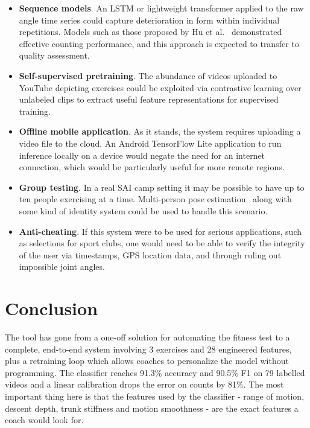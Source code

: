 \documentclass[conference]{IEEEtran}
\begin{document}
\begin{itemize}
     \item \textbf{Sequence models}. An LSTM or lightweight transformer applied to the raw angle time series could capture deterioration in form within individual repetitions. Models such as those proposed by Hu et al.~\cite{hu2022} demonstrated effective counting performance, and this approach is expected to transfer to quality assessment.
 \item \textbf{Self-supervised pretraining}. The abundance of videos uploaded to YouTube depicting exercises could be exploited via contrastive learning over unlabeled clips to extract useful feature representations for supervised training.
 \item \textbf{Offline mobile application}. As it stands, the system requires uploading a video file to the cloud. An Android TensorFlow Lite application to run inference locally on a device would negate the need for an internet connection, which would be particularly useful for more remote regions.
 \item \textbf{Group testing}. In a real SAI camp setting it may be possible to have up to ten people exercising at a time. Multi-person pose estimation~\cite{rtmpose2023} along with some kind of identity system could be used to handle this scenario.
 \item \textbf{Anti-cheating}. If this system were to be used for serious applications, such as selections for sport clubs, one would need to be able to verify the integrity of the user via timestamps, GPS location data, and through ruling out impossible joint angles.
\end{itemize}

\section{Conclusion}
The tool has gone from a one-off solution for automating the fitness test to a complete, end-to-end system involving 3 exercises and 28 engineered features, plus a retraining loop which allows coaches to personalize the model without programming. The classifier reaches 91.3\% accuracy and 90.5\% F1 on 79 labelled videos and a linear calibration drops the error on counts by 81\%. The most important thing here is that the features used by the classifier - range of motion, descent depth, trunk stiffness and motion smoothness - are the exact features a coach would look for.
\end{document}

